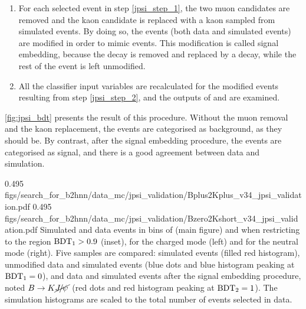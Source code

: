\begin{enumerate}
{0.8}
{figs/search_for_b2hnn/data_mc/jpsi_validation/Bplus2Kplus_v34_jpsi_skim.pdf}
{0.8}
{figs/search_for_b2hnn/data_mc/jpsi_validation/Bzero2Kshort_v34_jpsi_skim.pdf}
{
Simulated and data events satisfying the \BKjpsimumu selection criteria in bins of the beam-constrained mass of the \B meson candidate (left), the $\Delta E$ of the \B meson candidate (middle), the mass of the two-muon system (right), for the \BKpjpsi mode (top) and the \BKzjpsi mode (bottom).
}

\item \label{jpsi_step_2} For each selected event in step \ref{jpsi_step_1}, the two muon candidates are removed and the kaon candidate is replaced with a kaon sampled from simulated \BKnn events.
By doing so, the \BKjpsimumu events (both data and simulated events) are modified in order to mimic \BKnn events.
This modification is called signal embedding, because the \BKjpsi decay is removed and replaced by a \BKnn decay, while the rest of the event is left unmodified.
\item All the classifier input variables are recalculated for the modified events resulting from step \ref{jpsi_step_2}, and the outputs of \bdto and \bdtt are examined.
\end{enumerate}

\cref{fig:jpsi_bdt} presents the result of this procedure.
Without the muon removal and the kaon replacement, the \BKjpsimumu events are categorised as background, as they should be.
By contrast, after the signal embedding procedure, the events are categorised as signal, and there is a good agreement between data and simulation.

{0.495}
{figs/search_for_b2hnn/data_mc/jpsi_validation/Bplus2Kplus_v34_jpsi_validation.pdf}
{0.495}
{figs/search_for_b2hnn/data_mc/jpsi_validation/Bzero2Kshort_v34_jpsi_validation.pdf}
{
Simulated and data events in bins of \bdto (main figure) and \bdtt when restricting to the region $\mathrm{\mathrm{BDT_1}}>0.9$ (inset), for the charged mode (left) and for the neutral mode (right).
Five samples are compared: simulated \BKnn events (filled red histogram), unmodified data and simulated \BKjpsi events (blue dots and blue histogram peaking at $\mathrm{\mathrm{BDT_1}}=0$), and data and simulated \BKjpsi events after the signal embedding procedure, noted $B\rightarrow K\cancel{{J\mskip -3mu/\mskip -2mu\psi\mskip 2mu}}$ (red dots and red histogram peaking at $\mathrm{\mathrm{BDT_2}}=1$).
The simulation histograms are scaled to the total number of \BKjpsi events selected in data.
}


